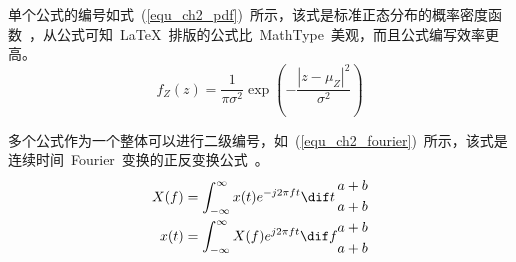 
单个公式的编号如式~(\ref{equ_ch2_pdf})~所示，该式是标准正态分布的概率密度函数~，从公式可知~\LaTeX~排版的公式比~MathType~美观，而且公式编写效率更高。
%
\begin{equation} \label{equ_ch2_pdf}
f_Z(z) = \frac{1}{\pi\sigma^2} \exp\left(-\frac{|z-\mu_Z|^2}{\sigma^2}\right)
\end{equation}


多个公式作为一个整体可以进行二级编号，如~(\ref{equ_ch2_fourier})~所示，该式是连续时间~Fourier~变换的正反变换公式~。
%
\begin{subequations} \label{equ_ch2_fourier}
\begin{align}
X(f) &= \int_{-\infty}^{\infty}x(t)e^{-j2\pi f t}\dif t \\
x(t) &= \int_{-\infty}^{\infty}X(f)e^{j2\pi f t}\dif f
\end{align}
\begin{align}
	a+b\\
	a+b\notag\\
	a+b\\
	a+b\\
\end{align}
\end{subequations}


